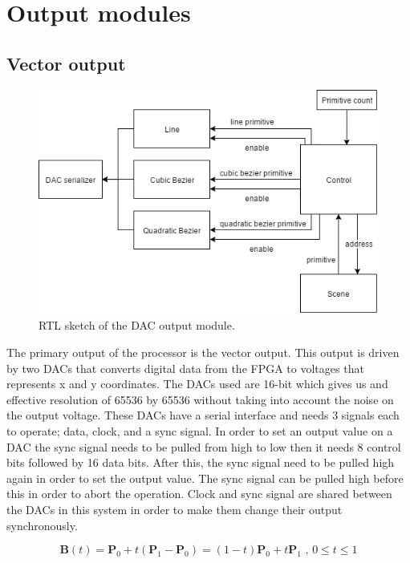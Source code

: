 \chapter{Output modules}
\label{chap:Output}

\section{Vector output}

\begin{figure}[h!]
    \includegraphics[width=\linewidth]{images/dac-output.png}
    \caption{RTL sketch of the \vthreek DAC output module.}
    \label{fig:dac-output}
\end{figure}

The primary output of the processor is the vector output.
This output is driven by two DACs that converts digital data from the FPGA to voltages that represents x and y coordinates.
The DACs used are 16-bit which gives us and effective resolution of 65536 by 65536 without taking into account the noise on the output voltage.
These DACs have a serial interface and needs 3 signals each to operate; data, clock, and a sync signal.
In order to set an output value on a DAC the sync signal needs to be pulled from high to low then it needs 8 control bits followed by 16 data bits.
After this, the sync signal need to be pulled high again in order to set the output value.
The sync signal can be pulled high before this in order to abort the operation.
Clock and sync signal are shared between the DACs in this system in order to make them change their output synchronously.

\begin{cequation}[H]
	\begin{equation*}
		\mathbf{B}(t)=\mathbf{P}_0 + t(\mathbf{P}_1-\mathbf{P}_0)=(1-t)\mathbf{P}_0 + t\mathbf{P}_1 \mbox{ , } 0 \le t \le 1
	\end{equation*}
	\caption{Linear Bezier curve}
\end{cequation}

